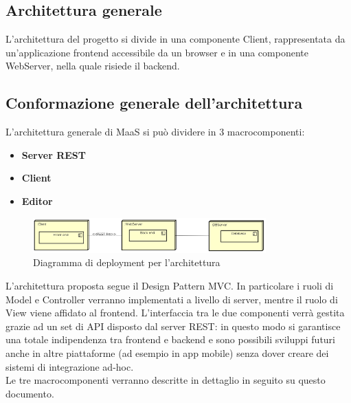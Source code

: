 \subsection{Architettura generale}
L'architettura del progetto si divide in una componente Client, rappresentata da un'applicazione frontend accessibile da un browser e in una componente WebServer, nella quale risiede il backend. 

\subsection{Conformazione generale dell'architettura}
L'architettura generale di MaaS si può dividere in 3 macrocomponenti:
\begin{itemize}
\item \textbf{Server REST} 
\item \textbf{Client} 
\item \textbf{Editor}
\end{itemize}
\begin{figure}[h]
\centering
\includegraphics[width=0.8\textwidth]{res/sections/GeneralArchitecture.png}
\caption{Diagramma di deployment per l'architettura}
\end{figure}
L'architettura proposta segue il Design Pattern MVC. In particolare i ruoli di Model e Controller verranno implementati a livello di server, mentre il ruolo di View viene affidato al frontend. L'interfaccia tra le due componenti verrà gestita grazie ad un set di API disposto dal server REST: in questo modo si garantisce una totale indipendenza tra frontend e backend e sono possibili sviluppi futuri anche in altre piattaforme (ad esempio in app mobile) senza dover creare dei sistemi di integrazione ad-hoc. \\
Le tre macrocomponenti verranno descritte in dettaglio in seguito su questo documento.
